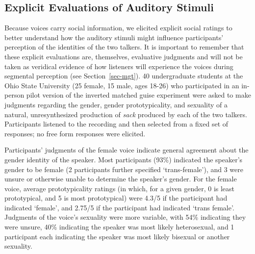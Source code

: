 \documentclass[
  letterpaper,
  DIV=11,
  numbers=noendperiod]{scrartcl}
\begin{document}
\subsection{Explicit Evaluations of Auditory
Stimuli}\label{sec-stim-evals}

Because voices carry social information, we elicited explicit social
ratings to better understand how the auditory stimuli might influence
participants' perception of the identities of the two talkers. It is
important to remember that these explicit evaluations are, themselves,
evaluative judgments and will not be taken as veridical evidence of how
listeners will experience the voices during segmental perception (see
Section~\ref{sec-mgt}). 40 undergraduate students at the Ohio State
University (25 female, 15 male, ages 18-26) who participated in an
in-person pilot version of the inverted matched guise experiment were
asked to make judgments regarding the gender, gender prototypicality,
and sexuality of a natural, unresynthesized production of \emph{sack}
produced by each of the two talkers. Participants listened to the
recording and then selected from a fixed set of responses; no free form
responses were elicited.

Participants' judgments of the female voice indicate general agreement
about the gender identity of the speaker. Most participants (93\%)
indicated the speaker's gender to be female (2 participants further
specified `trans-female'), and 3 were unsure or otherwise unable to
determine the speaker's gender. For the female voice, average
prototypicality ratings (in which, for a given gender, 0 is least
prototypical, and 5 is most prototypical) were 4.3/5 if the participant
had indicated `female', and 2.75/5 if the participant had indicated
`trans female'. Judgments of the voice's sexuality were more variable,
with 54\% indicating they were unsure, 40\% indicating the speaker was
most likely heterosexual, and 1 participant each indicating the speaker
was most likely bisexual or another sexuality.
\end{document}
